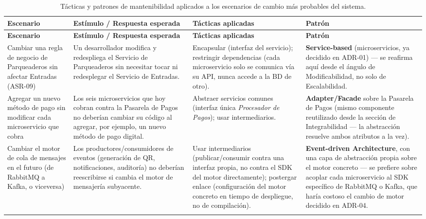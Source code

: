 \documentclass[12pt,a4paper]{article}
\begin{document}
\begin{center}
\begin{longtable}{p{2.6cm}p{4.7cm}p{3.6cm}p{2.9cm}}
\toprule
\textbf{Escenario} & \textbf{Estímulo / Respuesta esperada} & \textbf{Tácticas aplicadas} & \textbf{Patrón}\\
\midrule
\endfirsthead
\toprule
\textbf{Escenario} & \textbf{Estímulo / Respuesta esperada} & \textbf{Tácticas aplicadas} & \textbf{Patrón}\\
\midrule
\endhead
Cambiar una regla de negocio de Parqueaderos sin afectar Entradas (ASR-09) &
Un desarrollador modifica y redespliega el Servicio de Parqueaderos sin necesitar tocar ni
redesplegar el Servicio de Entradas. &
Encapsular (interfaz del servicio); restringir dependencias (cada microservicio solo se comunica
vía su API, nunca accede a la BD de otro). &
\textbf{Service-based} (microservicios, ya decidido en ADR-01) — se reafirma aquí desde el ángulo
de Modificabilidad, no solo de Escalabilidad.\\[0.5em]

Agregar un nuevo método de pago sin modificar cada microservicio que cobra &
Los seis microservicios que hoy cobran contra la Pasarela de Pagos no deberían cambiar su código
al agregar, por ejemplo, un nuevo método de pago digital. &
Abstraer servicios comunes (interfaz única \textit{Procesador de Pagos}); usar intermediarios. &
\textbf{Adapter/Facade} sobre la Pasarela de Pagos (mismo componente reutilizado desde la sección
de Integrabilidad — la abstracción resuelve ambos atributos a la vez).\\[0.5em]

Cambiar el motor de cola de mensajes en el futuro (de RabbitMQ a Kafka, o viceversa) &
Los productores/consumidores de eventos (generación de QR, notificaciones, auditoría) no deberían
reescribirse si cambia el motor de mensajería subyacente. &
Usar intermediarios (publicar/consumir contra una interfaz propia, no contra el SDK del motor
directamente); postergar enlace (configuración del motor concreto en tiempo de despliegue, no de
compilación). &
\textbf{Event-driven Architecture}, con una capa de abstracción propia sobre el motor concreto —
se prefiere sobre acoplar cada microservicio al SDK específico de RabbitMQ o Kafka, que haría
costoso el cambio de motor decidido en ADR-04.\\
\bottomrule
\caption{Tácticas y patrones de mantenibilidad aplicados a los escenarios de cambio más probables
del sistema.}
\label{tab:tacticas-mantenibilidad}
\end{longtable}
\end{center}
\end{document}
